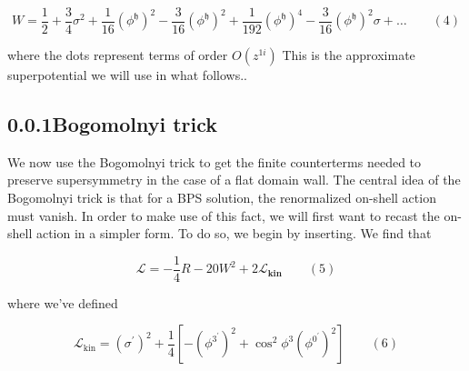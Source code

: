 \documentclass{article}
\begin{document}
\begin{equation}
W = { \frac { 1 } { 2 } } + { \frac { 3 } { 4 } } \sigma ^ { 2 } + { \frac { 1 } { 1 6 } } ( \phi ^ { \mathfrak { h } } ) ^ { 2 } - { \frac { 3 } { 1 6 } } ( \phi ^ { \mathfrak { h } } ) ^ { 2 } + { \frac { 1 } { 1 9 2 } } ( \phi ^ { \mathfrak { h } } ) ^ { 4 } - { \frac { 3 } { 1 6 } } ( \phi ^ { \mathfrak { h } } ) ^ { 2 } \sigma + \dots \qquad ( 4 )
\end{equation}


where the dots represent terms of order $O ( z ^ { 1 i } )$ This is the approximate superpotential we
will use in what follows..


\subsection*{0.0.1Bogomolnyi trick}


We now use the Bogomolnyi trick to get the finite counterterms needed to preserve supersymmetry in the case of a flat domain wall. The central idea of the Bogomolnyi trick is that
for a BPS solution, the renormalized on-shell action must vanish. In order to make use of
this fact, we will first want to recast the on-shell action in a simpler form. To do so, we
begin by inserting. We find that


\begin{equation}
\mathcal { L } = - \frac { 1 } { 4 } R - 2 0 W ^ { 2 } + 2 \mathcal { L } _ \mathbf { k i n } \qquad ( 5 )
\end{equation}


where we've defined


\begin{equation}
{ \mathcal { L } } _ { \mathrm { k i n } } = ( \sigma ^ { \prime } ) ^ { 2 } + { \frac { 1 } { 4 } } \left [ - ( { \phi ^ { 3 ^ { \prime } } } ) ^ { 2 } + \cos ^ { 2 } \phi ^ { 3 } ( { \phi ^ { 0 ^ { \prime } } } ) ^ { 2 } \right ] \qquad ( 6 )
\end{equation}
\end{document}
